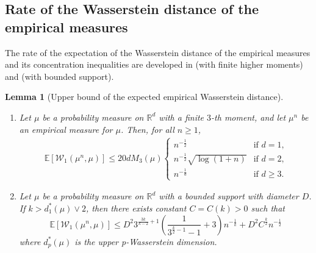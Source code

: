 \documentclass{amsart}
\theoremstyle{plain}
\numberwithin{equation}{section}\newtheorem{theorem}{Theorem}[section]
\newtheorem{lemma}[theorem]{Lemma}
\theoremstyle{remark}
\begin{document}
\begin{appendices}
\section{Rate of the Wasserstein distance of the empirical measures}
The rate of the expectation of the Wasserstein distance of the empirical measures and its concentration inequalities are developed in \cite[Theorems 1]{NF_AG_rate_Wasserstein} (with finite higher moments) and \cite[Proposition 5]{JW_FB_sample_rates} (with bounded support). 



\begin{lemma}[Upper bound of the expected empirical Wasserstein distance]\cite[Theorems 1]{NF_AG_rate_Wasserstein}\cite[Proposition 5]{JW_FB_sample_rates} \label{thm : upper bound of expected distance}
\begin{enumerate}
    \item[(i)] Let $\mu$ be a probability measure on $\mathbb{R}^{d}$ with a finite $3$-th moment, and let $\mu^{n}$ be an empirical measure for $\mu$. Then, for all $n \geq 1$,
\begin{equation}\label{eq: convergence rate of FG15}
    \begin{aligned}
    \mathbb{E}[\mathcal{W}_1(\mu^n,\mu)] \leq 20 d M_3(\mu) 
    \left\{ 
    \begin{array}{ll}
    n^{-\frac{1}{2}} & \textrm{if $d=1$,}\\
    n^{-\frac{1}{2}}\sqrt{\log (1 + n)} & \textrm{if $d=2$,}\\
    n^{-\frac{1}{d}} & \textrm{if $d \geq 3$.}
    \end{array} 
    \right.
    \end{aligned}
\end{equation}
    \item[(ii)] Let $\mu$ be a probability measure on $\mathbb{R}^{d}$ with a bounded support with diameter $D$. If $k > d^*_1(\mu) \vee 2$, then there exists constant $C=C(k) > 0$ such that
\begin{equation}\label{eq: convergence rate of WB19}
    \mathbb{E}[ \mathcal{W}_1(\mu^n,\mu)] \leq D^2  3^{\frac{3k}{k - 2} + 1}\left( \frac{1}{3^{\frac{k}{2} - 1} - 1} + 3 \right) n^{- \frac{1}{k}} + D^2 C^{\frac{k}{2}} n^{- \frac{1}{2}}  
\end{equation}
where $d^*_p(\mu)$ is the upper p-Wasserstein dimension.
\end{enumerate}
\end{lemma}






\end{appendices}
\end{document}
